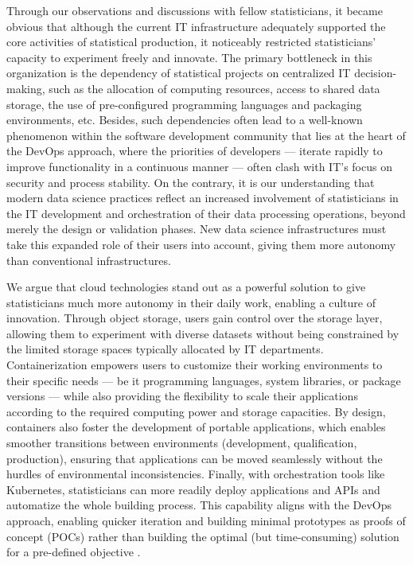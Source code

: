 \documentclass[graybox]{svmult}
\begin{document}
Through our observations and discussions with fellow statisticians, it became obvious that although the current IT infrastructure adequately supported the core activities of statistical production, it noticeably restricted statisticians' capacity to experiment freely and innovate. The primary bottleneck in this organization is the dependency of statistical projects on centralized IT decision-making, such as the allocation of computing resources, access to shared data storage, the use of pre-configured programming languages and packaging environments, etc. Besides, such dependencies often lead to a well-known phenomenon within the software development community that lies at the heart of the DevOps approach, where the priorities of developers — iterate rapidly to improve functionality in a continuous manner — often clash with IT's focus on security and process stability. On the contrary, it is our understanding that modern data science practices reflect an increased involvement of statisticians in the IT development and orchestration of their data processing operations, beyond merely the design or validation phases. New data science infrastructures must take this expanded role of their users into account, giving them more autonomy than conventional infrastructures.

We argue that cloud technologies stand out as a powerful solution to give statisticians much more autonomy in their daily work, enabling a culture of innovation. Through object storage, users gain control over the storage layer, allowing them to experiment with diverse datasets without being constrained by the limited storage spaces typically allocated by IT departments. Containerization empowers users to customize their working environments to their specific needs — be it programming languages, system libraries, or package versions — while also providing the flexibility to scale their applications according to the required computing power and storage capacities. By design, containers also foster the development of portable applications, which enables smoother transitions between environments (development, qualification, production), ensuring that applications can be moved seamlessly without the hurdles of environmental inconsistencies. Finally, with orchestration tools like Kubernetes, statisticians can more readily deploy applications and APIs and automatize the whole building process. This capability aligns with the DevOps approach, enabling quicker iteration and building minimal prototypes as proofs of concept (POCs) rather than building the optimal (but time-consuming) solution for a pre-defined objective \cite{leite2019survey}.
\end{document}
